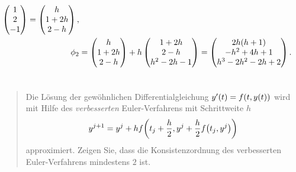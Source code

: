 \documentclass{exercise}
\begin{document}
\begin{enumerate}
\begin{align*}
\begin{pmatrix}
				1\\
				2\\
				-1
			\end{pmatrix} = \begin{pmatrix}
				h\\
				1 + 2h\\
				2 - h
			\end{pmatrix},\\
			\phi_2 &= \begin{pmatrix}
				h\\
				1 + 2h\\
				2 - h
			\end{pmatrix} + h\begin{pmatrix}
				1 + 2h\\
				2 - h\\
				h^2 - 2h - 1
			\end{pmatrix} = \begin{pmatrix}
				2h\parentheses*{h + 1}\\
				-h^2 + 4h + 1\\
				h^3 - 2h^2 - 2h + 2
			\end{pmatrix}.
		\end{align*}
	\end{enumerate}


	\section{}

	\begin{quote}
		Die Lösung der gewöhnlichen Differentialgleichung \(y'\parentheses*{t} = f\parentheses*{t, y\parentheses*{t}}\) wird mit Hilfe des \emph{verbesserten} Euler-Verfahrens mit Schrittweite \(h\)
		\[
			y^{j + 1} = y^j + hf\parentheses*{t_j + \frac{h}{2}, y^j + \frac{h}{2}f\parentheses*{t_j, y^j}}
		\]
		approximiert.
		Zeigen Sie, dass die Konsistenzordnung des verbesserten Euler-Verfahrens mindestens \(2\) ist.
	\end{quote}
\end{document}
